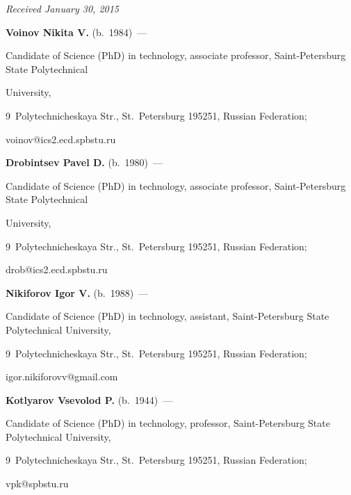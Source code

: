  \hfill{\small\textit{Received January 30, 2015}}



  \Contr



  \noindent

  \textbf{Voinov Nikita V.} (b.\ 1984)~---

  Candidate of Science (PhD) in technology, associate professor, Saint-Petersburg State Polytechnical

University,

  9~Polytechnicheskaya Str.,  St.\ Petersburg 195251, Russian Federation;

   voinov@ics2.ecd.spbstu.ru



  \vspace*{3pt}



  \noindent

  \textbf{Drobintsev Pavel D.} (b.\ 1980)~---

  Candidate of Science (PhD) in technology, associate professor, Saint-Petersburg State Polytechnical

University,

  9~Polytechnicheskaya Str.,  St.\ Petersburg 195251, Russian Federation;

  drob@ics2.ecd.spbstu.ru



  \vspace*{3pt}



  \noindent

  \textbf{Nikiforov Igor V.} (b.\ 1988)~---

     Candidate of Science (PhD) in technology, assistant, Saint-Petersburg State Polytechnical University,

  9~Polytechnicheskaya Str.,  St.\ Petersburg 195251, Russian Federation;

  igor.nikiforovv@gmail.com



  \vspace*{3pt}



  \noindent

  \textbf{Kotlyarov Vsevolod P.} (b.\ 1944)~---

    Candidate  of Science  (PhD) in technology, professor,  Saint-Petersburg State Polytechnical University,

  9~Polytechnicheskaya Str.,  St.\ Petersburg 195251, Russian Federation;

  vpk@spbstu.ru





  \label{end\stat}





  \renewcommand{\bibname}{\protect\rm Литература}

